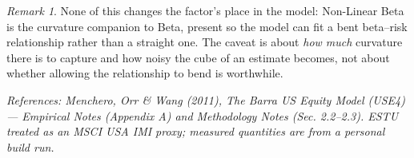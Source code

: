 \documentclass[11pt]{article}
\theoremstyle{definition}
\theoremstyle{plain}
\theoremstyle{remark}
\newtheorem*{remark}{Remark}
\begin{document}
\begin{remark}
None of this changes the factor's place in the model: Non-Linear Beta is the curvature companion to Beta, present so the model can fit a bent beta--risk relationship rather than a straight one. The caveat is about \emph{how much} curvature there is to capture and how noisy the cube of an estimate becomes, not about whether allowing the relationship to bend is worthwhile.
\end{remark}

\begin{center}\small\itshape
References: Menchero, Orr \& Wang (2011), \textit{The Barra US Equity Model (USE4)} --- Empirical Notes (Appendix A) and Methodology Notes (Sec. 2.2--2.3). ESTU treated as an MSCI USA IMI proxy; measured quantities are from a personal build run.
\end{center}
\end{document}
